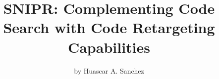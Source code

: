 \documentclass[fontsize=8pt]{memoir} %
\begin{document}
\title{\uppercase{SnipR}: Complementing Code Search with Code Retargeting Capabilities}
\author{by Huascar A. Sanchez}

\date{}
\maketitle
\newpage








% 


\todos


\end{document}
